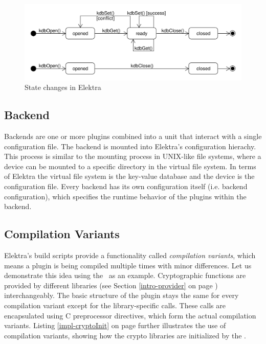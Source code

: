 \begin{figure}[h]
\center
\caption{State changes in Elektra}
\label{impl_elektra_states}
\includegraphics[width=15.0cm]{umlet-figures/impl_elektra_state.pdf}
\end{figure}

\subsection{Backend}

Backends are one or more plugins combined into a unit that interact with a single configuration file.
The backend is mounted into Elektra's configuration hierachy.
This process is similar to the mounting process in UNIX-like file systems, where a device can be mounted to a specific directory in the virtual file system.
In terms of Elektra the virtual file system is the key-value database and the device is the configuration file.
Every backend has its own configuration itself (i.e. backend configuration), which specifies the runtime behavior of the plugins within the backend.

\subsection{Compilation Variants}

Elektra's build scripts provide a functionality called \emph{compilation variants}, which means a plugin is being compiled multiple times with minor differences.
Let us demonstrate this idea using the \crypto ~as an example.
Cryptographic functions are provided by different libraries (see Section \ref{intro-provider} on page \pageref{intro-provider}) interchangeably.
The basic structure of the plugin stays the same for every compilation variant except for the library-specific calls.
These calls are encapsulated using C preprocessor directives, which form the actual compilation variants.
Listing \ref{impl-cryptoInit} on page \pageref{impl-cryptoInit} further illustrates the use of compilation variants, showing how the crypto libraries are initialized by the \crypto.

